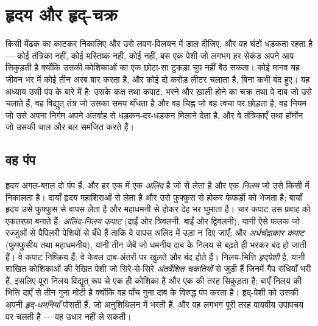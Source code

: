 \chapter{हृदय और हृद्-चक्र}\label{ch:b2:heart}

किसी मेंढक का  काटकर निकालिए और उसे लवण-विलयन में डाल दीजिए, और वह
घंटों धड़कता रहता है --- कोई तंत्रिका नहीं, कोई मस्तिष्क नहीं, कोई 
नहीं, बस एक पेशी जो लगभग हर सेकंड अपने आप सिकुड़ती है क्योंकि उसकी
कोशिकाओं का एक छोटा-सा टुकड़ा चुप नहीं बैठ सकता। कोई मानव  यह
जीवन भर में कोई तीन अरब बार करता है, और कोई दो
करोड़ लीटर चलाता है, बिना कभी बंद हुए। यह
अध्याय उसी पंप के बारे में है: उसके कक्ष तथा कपाट, भरने और
ख़ाली होने का चक्र तथा वे दाब जो उसे चलाते हैं, वह विद्युत्
तंत्र जो उसका समय बाँधता है और वह चिह्न जो वह त्वचा पर छोड़ता है, वह नियम
जो उसे अपना निर्गम अपने अंतर्वाह से धड़कन-दर-धड़कन मिलाने देता है, और वे
तंत्रिकाएँ तथा हॉर्मोन जो उसकी चाल और बल समंजित करते हैं।

\section{वह पंप}

\begin{definition}[कक्ष और कपाट]\label{def:b2:heart:anatomy}
हृदय अगल-बग़ल दो पंप हैं, और हर एक में एक \emph{अलिंद} है जो
 से  लेता है और एक \emph{निलय} जो उसे किसी
 में निकालता है। दायाँ हृदय महाशिराओं से  लेता है
और उसे फुफ्फुस  से होकर फेफड़ों को भेजता है; बायाँ
हृदय उसे फुफ्फुस  से वापस लेता है और महाधमनी से होकर
देह भर घुमाता है। चार कपाट उस प्रवाह को एकतरफ़ा बनाते हैं:
\emph{अलिंद-निलय कपाट} (दाईं ओर त्रिवलनी, बाईं ओर
द्विवलनी), यानी ऐसे फलक जो रज्जुओं से पैपिलरी पेशियों से बँधे हैं ताकि
वे वापस अलिंद में उड़ा न दिए जाएँ; और
\emph{अर्धचंद्राकार कपाट} (फुफ्फुसीय तथा महाधमनीय), यानी तीन जेबें जो
धमनीय दाब के निलय से बढ़ते ही भरकर बंद हो जाती हैं।
वे कपाट निष्क्रिय हैं: वे केवल दाब-अंतरों पर खुलते और बंद
होते हैं। निलय-भित्ति \emph{हृद्पेशी} है, यानी
शाखित कोशिकाओं की रेखित पेशी जो सिरे-से-सिरे
\emph{अंतर्वेशित चकतियों} से जुड़ी हैं जिनमें गैप संधियाँ भरी हैं, इसलिए पूरा
निलय विद्युत् रूप से एक ही कोशिका है और एक की तरह सिकुड़ता है; बाएँ
निलय की भित्ति दाएँ से तीन गुना मोटी है क्योंकि वह
पाँच गुना दाब के विरुद्ध पंप करता है। हृद्-पेशी को उसकी अपनी
\emph{हृद्-धमनियाँ} पोसती हैं, जो अनुशिथिलन में भरती हैं, और वह
लगभग पूरी तरह वायवीय उपापचय पर चलती है --- वह उधार नहीं ले सकती।
\end{definition}

